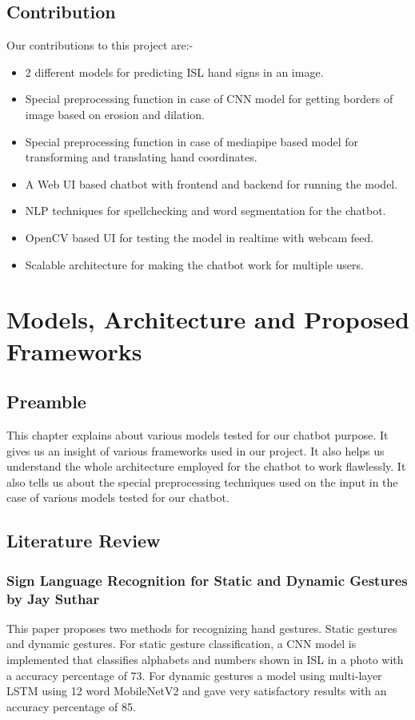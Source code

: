 \documentclass[12pt,a4paper]{report}
\begin{document}
\section{Contribution}
Our contributions to this project are:-
\begin{itemize}
	\item 2 different models for predicting ISL hand signs in an image.
	\item Special preprocessing function in case of CNN model for getting borders of image based on erosion and dilation.
	\item Special preprocessing function in case of mediapipe based model for transforming and translating hand coordinates.
	\item A Web UI based chatbot with frontend and backend for running the model.
	\item NLP techniques for spellchecking and word segmentation for the chatbot.
	\item OpenCV based UI for testing the model in realtime with webcam feed.
	\item Scalable architecture for making the chatbot work for multiple users.
\end{itemize}

\chapter{Models, Architecture and Proposed Frameworks}

\section{Preamble}
This chapter explains about various models tested for our chatbot purpose. It gives us an insight of various frameworks used in our project. It also helps us understand the whole architecture employed for the chatbot to work flawlessly. It also tells us about the special preprocessing techniques used on the input in the case of various models tested for our chatbot.

\section{Literature Review}

\subsection{Sign Language Recognition for Static and Dynamic Gestures by Jay Suthar\cite{b1}}
This paper proposes two methods for recognizing hand gestures. Static gestures and dynamic gestures. For static gesture classification, a CNN model is implemented that classifies alphabets and numbers shown in ISL in a photo with a accuracy percentage of 73. For dynamic gestures a model using multi-layer LSTM using 12 word MobileNetV2 and gave very satisfactory results with an accuracy percentage of 85.
\end{document}
